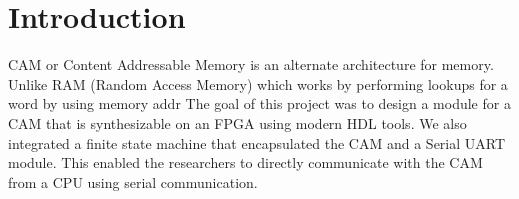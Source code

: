\section{Introduction}
CAM or Content Addressable Memory is an alternate architecture for memory. Unlike RAM (Random Access Memory) which works by performing lookups for a word by using memory addr
The goal of this project was to design a module for a CAM that is synthesizable on an FPGA using modern HDL tools. 
We also integrated a finite state machine that encapsulated the CAM and a Serial UART module. 
This enabled the researchers to directly communicate with the CAM from a CPU using serial communication. 
